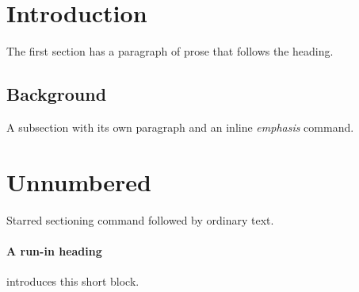 \section{Introduction}
The first section has a paragraph of prose that follows the heading.

\subsection{Background}
A subsection with its own paragraph and an inline \emph{emphasis} command.

\section*{Unnumbered}
Starred sectioning command followed by ordinary text.

\paragraph{A run-in heading} introduces this short block.
